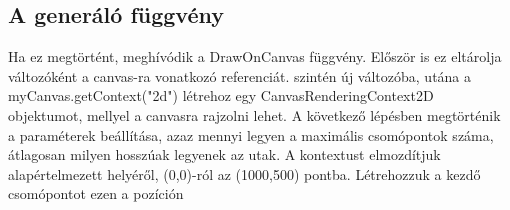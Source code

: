 \subsection{A generáló függvény}
Ha ez megtörtént, meghívódik a DrawOnCanvas függvény. Először is ez eltárolja változóként a canvas-ra vonatkozó referenciát.
szintén új változóba, utána a myCanvas.getContext("2d") létrehoz egy CanvasRenderingContext2D objektumot, mellyel a canvasra rajzolni lehet. A következő lépésben megtörténik a paraméterek beállítása, azaz mennyi legyen a maximális csomópontok száma, átlagosan milyen hosszúak legyenek az utak. 
A kontextust elmozdítjuk alapértelmezett helyéről, (0,0)-ról az (1000,500) pontba. Létrehozzuk a kezdő csomópontot ezen a pozíción%
